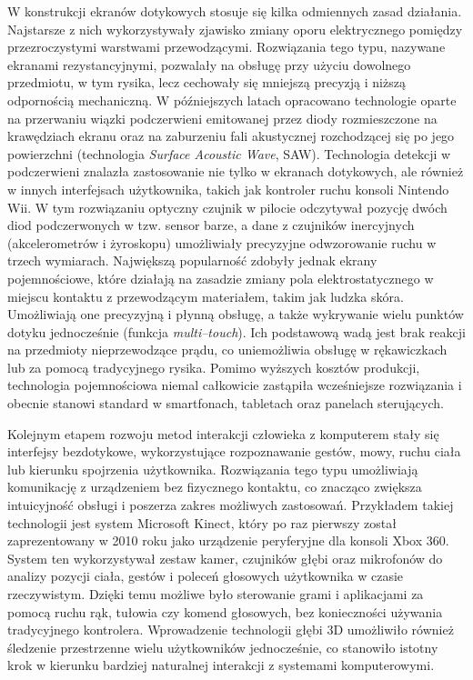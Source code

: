 W konstrukcji ekranów dotykowych stosuje się kilka odmiennych zasad działania. Najstarsze z nich wykorzystywały zjawisko zmiany oporu elektrycznego pomiędzy przezroczystymi warstwami przewodzącymi. Rozwiązania tego typu, nazywane ekranami rezystancyjnymi, pozwalały na obsługę przy użyciu dowolnego przedmiotu, w tym rysika, lecz cechowały się mniejszą precyzją i niższą odpornością mechaniczną. W późniejszych latach opracowano technologie oparte na przerwaniu wiązki podczerwieni emitowanej przez diody rozmieszczone na krawędziach ekranu oraz na zaburzeniu fali akustycznej rozchodzącej się po jego powierzchni (technologia \textit{Surface Acoustic Wave}, SAW). Technologia detekcji w podczerwieni znalazła zastosowanie nie tylko w ekranach dotykowych, ale również w innych interfejsach użytkownika, takich jak kontroler ruchu konsoli Nintendo Wii. W tym rozwiązaniu optyczny czujnik w pilocie odczytywał pozycję dwóch diod podczerwonych w tzw. sensor barze, a dane z czujników inercyjnych (akcelerometrów i żyroskopu) umożliwiały precyzyjne odwzorowanie ruchu w trzech wymiarach. Największą popularność zdobyły jednak ekrany pojemnościowe, które działają na zasadzie zmiany pola elektrostatycznego w miejscu kontaktu z przewodzącym materiałem, takim jak ludzka skóra. Umożliwiają one precyzyjną i płynną obsługę, a także wykrywanie wielu punktów dotyku jednocześnie (funkcja \textit{multi--touch}). Ich podstawową wadą jest brak reakcji na przedmioty nieprzewodzące prądu, co uniemożliwia obsługę w rękawiczkach lub za pomocą tradycyjnego rysika. Pomimo wyższych kosztów produkcji, technologia pojemnościowa niemal całkowicie zastąpiła wcześniejsze rozwiązania i obecnie stanowi standard w smartfonach, tabletach oraz panelach sterujących.

Kolejnym etapem rozwoju metod interakcji człowieka z komputerem stały się interfejsy bezdotykowe, wykorzystujące rozpoznawanie gestów, mowy, ruchu ciała lub kierunku spojrzenia użytkownika. Rozwiązania tego typu umożliwiają komunikację z urządzeniem bez fizycznego kontaktu, co znacząco zwiększa intuicyjność obsługi i poszerza zakres możliwych zastosowań. Przykładem takiej technologii jest system Microsoft Kinect, który po raz pierwszy został zaprezentowany w 2010 roku jako urządzenie peryferyjne dla konsoli Xbox 360. System ten wykorzystywał zestaw kamer, czujników głębi oraz mikrofonów do analizy pozycji ciała, gestów i poleceń głosowych użytkownika w czasie rzeczywistym. Dzięki temu możliwe było sterowanie grami i aplikacjami za pomocą ruchu rąk, tułowia czy komend głosowych, bez konieczności używania tradycyjnego kontrolera. Wprowadzenie technologii głębi 3D umożliwiło również śledzenie przestrzenne wielu użytkowników jednocześnie, co stanowiło istotny krok w kierunku bardziej naturalnej interakcji z systemami komputerowymi.


